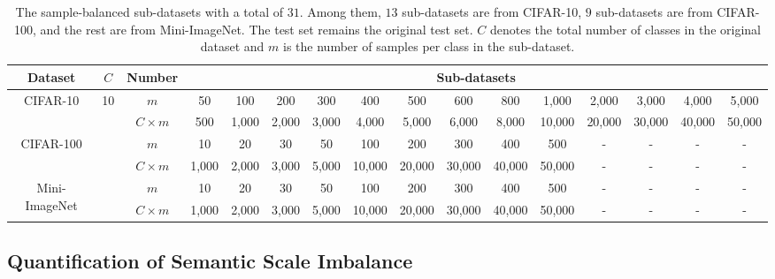 \documentclass[10pt]{article} %
\begin{document}
\begin{table}[h]
\vskip -0.17in
\renewcommand\arraystretch{2}
\setlength{\tabcolsep}{3.6pt} %
\caption{The sample-balanced sub-datasets with a total of $31$. Among them, $13$ sub-datasets are from CIFAR-10, $9$ sub-datasets are from CIFAR-100, and the rest are from Mini-ImageNet. The test set remains the original test set. $C$ denotes the total number of classes in the original dataset and $m$ is the number of samples per class in the sub-dataset.}
\label{table6}
\begin{center}
\begin{scriptsize}
\begin{tabular}{c|c|p{0.7cm}| ccccccccccccc}
\hline \toprule
Dataset       & $C$  & Number  &  \multicolumn{13}{c}{Sub-datasets} \\
\hline
\multirow{2}{*}{CIFAR-10}  &  \multirow{2}{0.25cm}{10} & \multicolumn{1}{c|}{$m$}  & 50  & 100 &  200 & 300 & 400 & 500 & 600 & 800 & 1,000 & 2,000 & 3,000 & 4,000 & 5,000 \\
  &   & \multicolumn{1}{c|}{$C\! \times\! m$}  & 500  & 1,000 &  2,000 & 3,000 & 4,000 & 5,000 & 6,000 & 8,000 & 10,000 & 20,000 & 30,000 & 40,000 & 50,000 \\
\hline
\multirow{2}{*}{CIFAR-100}  &  \multirow{2}{0.25cm}{\!100} & \multicolumn{1}{c|}{$m$}  & 10  & 20 &  30 & 50 & 100 & 200 & 300 & 400 & 500 & - & - & - & - \\
  &   & \multicolumn{1}{c|}{$C\! \times\! m$}  & 1,000  & 2,000 &  3,000 & 5,000 & 10,000 & 20,000 & 30,000 & 40,000 & 50,000 & - & - & - & - \\
\hline
\multirow{2}{*}{Mini-ImageNet}  &  \multirow{2}{0.25cm}{\!100} & \multicolumn{1}{c|}{$m$}  & 10  & 20 &  30 & 50 & 100 & 200 & 300 & 400 & 500 & - & - & - & - \\
  &   & \multicolumn{1}{c|}{$C\! \times\! m$}  & 1,000  & 2,000 &  3,000 & 5,000 & 10,000 & 20,000 & 30,000 & 40,000 & 50,000 & - & - & - & - \\
\bottomrule \hline
\end{tabular}
\end{scriptsize}
\end{center}
\vskip -0.3in
\end{table}





\subsection{Quantification of Semantic Scale Imbalance\label{B.2}}
\end{document}
